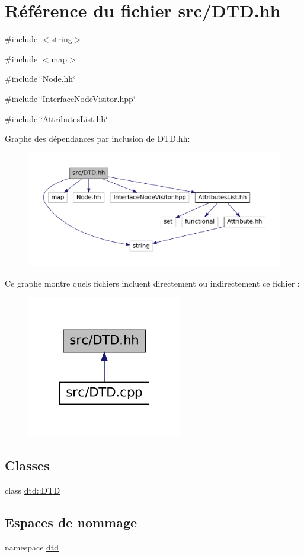 \hypertarget{_d_t_d_8hh}{
\section{Référence du fichier src/DTD.hh}
\label{_d_t_d_8hh}
}
{\ttfamily \#include $<$string$>$}\par
{\ttfamily \#include $<$map$>$}\par
{\ttfamily \#include \char`\"{}Node.hh\char`\"{}}\par
{\ttfamily \#include \char`\"{}InterfaceNodeVisitor.hpp\char`\"{}}\par
{\ttfamily \#include \char`\"{}AttributesList.hh\char`\"{}}\par
Graphe des dépendances par inclusion de DTD.hh:\nopagebreak
\begin{figure}[H]
\begin{center}
\leavevmode
\includegraphics[width=400pt]{_d_t_d_8hh__incl}
\end{center}
\end{figure}
Ce graphe montre quels fichiers incluent directement ou indirectement ce fichier :\nopagebreak
\begin{figure}[H]
\begin{center}
\leavevmode
\includegraphics[width=192pt]{_d_t_d_8hh__dep__incl}
\end{center}
\end{figure}
\subsection*{Classes}
\begin{DoxyCompactItemize}
\item 
class \hyperlink{classdtd_1_1_d_t_d}{dtd::DTD}
\end{DoxyCompactItemize}
\subsection*{Espaces de nommage}
\begin{DoxyCompactItemize}
\item 
namespace \hyperlink{namespacedtd}{dtd}
\end{DoxyCompactItemize}
